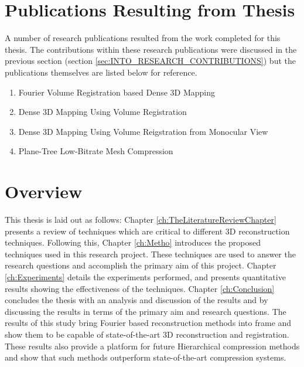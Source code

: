 \section{Publications Resulting from Thesis}

A number of research publications resulted from the work completed for this thesis. The contributions within these research publications were discussed in the previous section (section \ref{sec:INTO_RESEARCH_CONTRIBUTIONS}) but the publications themselves are listed below for reference.

\begin{enumerate}
  \item Fourier Volume Registration based Dense 3D Mapping \cite{Lincoln16Fourier}
  \item Dense 3D Mapping Using Volume Registration \cite{Lincoln16Dense}
  \item Dense 3D Mapping Using Volume Reigstration from Monocular View \cite{Lincoln16Monocular}
  \item Plane-Tree Low-Bitrate Mesh Compression \cite{Lincoln15Plane}
\end{enumerate}

\section{Overview}

This thesis is laid out as follows: Chapter \ref{ch:TheLiteratureReviewChapter} presents a review of techniques which are critical to different 3D reconstruction techniques. Following this, Chapter \ref{ch:Metho} introduces the proposed techniques used in this research project. These techniques are used to answer the research questions and accomplish the primary aim of this project. Chapter \ref{ch:Experiments} details the experiments performed, and presents quantitative results showing the effectiveness of the techniques. Chapter \ref{ch:Conclusion} concludes the thesis with an analysis and discussion of the results and by discussing the results in terms of the primary aim and research questions. The results of this study bring Fourier based reconstruction methods into frame and show them to be capable of state-of-the-art 3D reconstruction and registration. These results also provide a platform for future Hierarchical compression methods and show that such methods outperform state-of-the-art compression systems.


